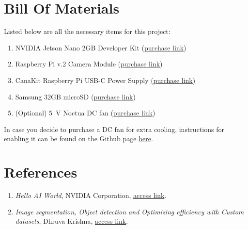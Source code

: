\documentclass[letter, 12pt]{article}
\begin{document}
	\newpage
	\section{Bill Of Materials}
	\noindent Listed below are all the necessary items for this project:
	\begin{enumerate}
		\item NVIDIA Jetson Nano 2GB Developer Kit (\href{https://www.amazon.com/gp/product/B08J157LHH/ref=ppx_yo_dt_b_asin_title_o03_s00?ie=UTF8&psc=1}{purchase link})
		\item Raspberry Pi v.2 Camera Module (\href{https://www.amazon.com/gp/product/B01ER2SKFS/ref=ppx_yo_dt_b_asin_title_o03_s00?ie=UTF8&psc=1}{purchase link})
		\item CanaKit Raspberry Pi USB-C Power Supply \href{https://www.amazon.com/CanaKit-Raspberry-Power-Supply-USB-C/dp/B07TYQRXTK/ref=sr_1_4?crid=2DKOJXC3JNR55&dchild=1&keywords=raspberry+pi+power+supply&qid=1623127404&sprefix=raspberry+pi+power+%2Caps%2C230&sr=8-4}{(purchase link)}
		\item Samsung 32GB microSD (\href{https://www.amazon.com/Samsung-MicroSDHC-Adapter-MB-ME32GA-AM/dp/B06XWN9Q99/ref=sr_1_3?dchild=1&keywords=samsung+micro+sd+card+32gb&qid=1623127502&sr=8-3}{purchase link})
		\item (Optional) 5~V Noctua DC fan (\href{https://www.amazon.com/Noctua-NF-A4x20-5V-PWM-Premium-Quality/dp/B071FNHVXN/ref=sr_1_14?dchild=1&keywords=Jetson+Nano+fan&qid=1623127615&sr=8-14}{purchase link})
	\end{enumerate}
	\noindent In case you decide to purchase a DC fan for extra cooling, instructions for enabling it can be found on the Github page \href{https://github.com/Pyrestone/jetson-fan-ctl}{here}.
	
	\newpage
	\section{References}
	\begin{enumerate}
		\item \textit{Hello AI World}, NVIDIA Corporation, \href{https://github.com/dusty-nv/jetson-inference/#pre-trained-models}{access link}.
		\item \textit{Image segmentation, Object detection and Optimizing efficiency with Custom datasets}, Dhruva Krishna, \href{https://sfsu.box.com/s/7sculhqpedx7zvrq7k60w97uwzy7r0gu}{access link}.
	\end{enumerate}
\end{document}
